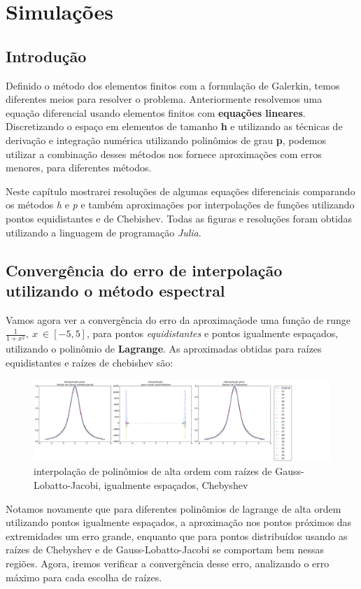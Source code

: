 \chapter{Simulações}
\label{cap:III}
\section{Introdução}
 Definido o método dos elementos finitos com a formulação de Galerkin, temos diferentes meios para resolver o problema. Anteriormente resolvemos uma equação diferencial usando elementos finitos com \textbf{equações lineares}. Discretizando o espaço em elementos de tamanho \textbf{h} e utilizando as técnicas de derivação e integração numérica utilizando polinômios de grau \textbf{p}, podemos utilizar a combinação desses métodos nos fornece aproximações com erros menores, para diferentes métodos.
 
 Neste capítulo mostrarei resoluções de algumas equações diferenciais comparando os métodos \emph{h} e \emph{p}  e também aproximações por interpolações de funções utilizando pontos equidistantes e de Chebishev. Todas as figuras e resoluções foram obtidas utilizando a linguagem de programação \emph{Julia}.

\section{Convergência do erro de interpolação utilizando o método espectral}
	Vamos agora ver a convergência do erro da aproximaçãode uma função de runge $\frac{1}{1+x^2},\ x\ \in [-5,5]$, para pontos \emph{equidistantes} e pontos igualmente espaçados, utilizando o polinômio de \textbf{Lagrange}.
	As aproximadas obtidas para raízes equidistantes e raízes de chebishev são:\\	
\begin{figure}[!ht]
  \includegraphics[width=1\textwidth,center]{figuras/interpolacao_todas.png}
  \caption{interpolação de polinômios de alta ordem com raízes de Gauss-Lobatto-Jacobi, igualmente espaçados, Chebyshev}
\end{figure}
Notamos novamente que para diferentes  polinômios de lagrange de alta ordem utilizando pontos igualmente espaçados, a aproximação nos pontos próximos das extremidades um erro  grande, enquanto que para pontos distribuídos usando as raízes de Chebyshev e de Gauss-Lobatto-Jacobi se comportam bem nessas regiões. Agora, iremos verificar a convergência desse erro, analizando o erro máximo para cada escolha de raízes.

